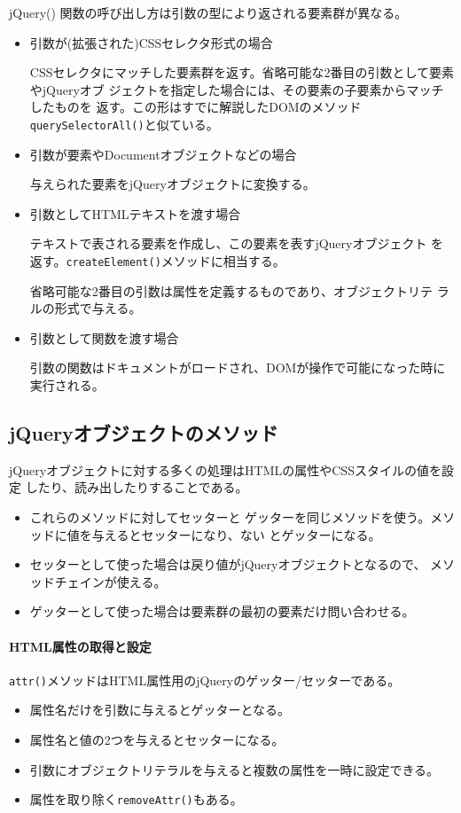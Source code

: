 jQuery() 関数の呼び出し方は引数の型により返される要素群が異なる。
\begin{itemize}
 \item 引数が(拡張された)CSSセレクタ形式の場合

 CSSセレクタにマッチした要素群を返す。省略可能な2番目の引数として要素やjQueryオブ
       ジェクトを指定した場合には、その要素の子要素からマッチしたものを
       返す。この形はすでに解説したDOMのメソッド
       \texttt{querySelectorAll()}と似ている。
 \item 引数が要素やDocumentオブジェクトなどの場合

       与えられた要素をjQueryオブジェクトに変換する。
 \item 引数としてHTMLテキストを渡す場合

       テキストで表される要素を作成し、この要素を表すjQueryオブジェクト
       を返す。\texttt{createElement()}メソッドに相当する。

       省略可能な2番目の引数は属性を定義するものであり、オブジェクトリテ
       ラルの形式で与える。
 \item 引数として関数を渡す場合

       引数の関数はドキュメントがロードされ、DOMが操作で可能になった時に実行される。
\end{itemize}
\subsection{jQueryオブジェクトのメソッド}
jQueryオブジェクトに対する多くの処理はHTMLの属性やCSSスタイルの値を設定
したり、読み出したりすることである。
\begin{itemize}
 \item これらのメソッドに対してセッターと
ゲッターを同じメソッドを使う。メソッドに値を与えるとセッターになり、ない
とゲッターになる。
 \item セッターとして使った場合は戻り値がjQueryオブジェクトとなるので、
       メソッドチェインが使える。
 \item ゲッターとして使った場合は要素群の最初の要素だけ問い合わせる。
\end{itemize}
\paragraph{HTML属性の取得と設定}
\texttt{attr()}メソッドはHTML属性用のjQueryのゲッター/セッターである。
\begin{itemize}
 \item 属性名だけを引数に与えるとゲッターとなる。
 \item 属性名と値の2つを与えるとセッターになる。
 \item 引数にオブジェクトリテラルを与えると複数の属性を一時に設定できる。
 \item 属性を取り除く\texttt{removeAttr()}もある。
\end{itemize}
